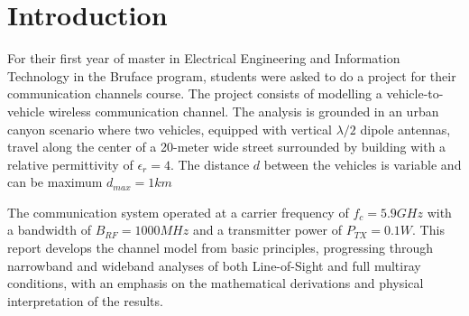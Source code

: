 \setcounter{secnumdepth}{-1}
\chapter{Introduction}
For their first year of master in Electrical Engineering and Information Technology in the Bruface program, students were asked to do a project for their communication channels course. The project consists of modelling a vehicle-to-vehicle wireless communication channel. The analysis is grounded in an urban canyon scenario where two vehicles, equipped with vertical $\lambda/2$ dipole antennas, travel along the center of a 20-meter wide street surrounded by building with a relative permittivity of $\epsilon_r=4$. The distance $d$ between the vehicles is variable and can be maximum $d_{max} = 1 km$

The communication system operated at a carrier frequency of $f_c = 5.9 GHz$ with a bandwidth of $B_{RF} = 1000 MHz$ and a transmitter power of $P_{TX} = 0.1 W$. This report develops the channel model from basic principles, progressing through narrowband and wideband analyses of both Line-of-Sight and full multiray conditions, with an emphasis on the mathematical derivations and physical interpretation of the results.

